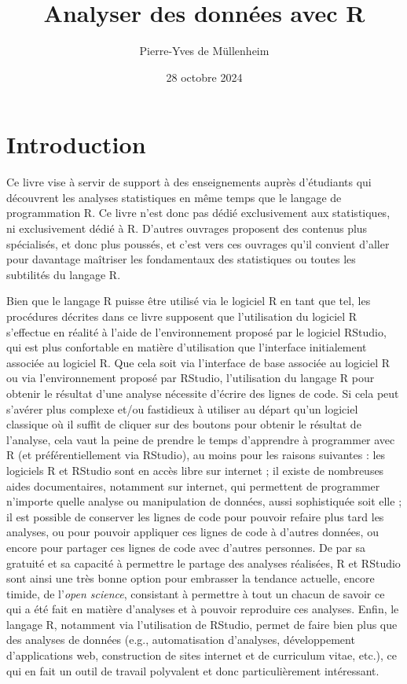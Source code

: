 \documentclass[
  letterpaper,
]{book}
\title{Analyser des données avec R}
\author{Pierre-Yves de Müllenheim}
\date{28 octobre 2024}
\renewcommand*\contentsname{Table des matières}
\newcommand\contentsname{Table des matières}
\begin{document}
\frontmatter
\maketitle

\renewcommand*\contentsname{Sommaire}
{
\setcounter{tocdepth}{2}
\tableofcontents
}

\mainmatter
{}

\chapter*{Introduction}\label{introduction}


Ce livre vise à servir de support à des enseignements auprès d'étudiants
qui découvrent les analyses statistiques en même temps que le langage de
programmation R. Ce livre n'est donc pas dédié exclusivement aux
statistiques, ni exclusivement dédié à R. D'autres ouvrages proposent
des contenus plus spécialisés, et donc plus poussés, et c'est vers ces
ouvrages qu'il convient d'aller pour davantage maîtriser les
fondamentaux des statistiques ou toutes les subtilités du langage R.

Bien que le langage R puisse être utilisé via le logiciel R en tant que
tel, les procédures décrites dans ce livre supposent que l'utilisation
du logiciel R s'effectue en réalité à l'aide de l'environnement proposé
par le logiciel RStudio, qui est plus confortable en matière
d'utilisation que l'interface initialement associée au logiciel R. Que
cela soit via l'interface de base associée au logiciel R ou via
l'environnement proposé par RStudio, l'utilisation du langage R pour
obtenir le résultat d'une analyse nécessite d'écrire des lignes de code.
Si cela peut s'avérer plus complexe et/ou fastidieux à utiliser au
départ qu'un logiciel classique où il suffit de cliquer sur des boutons
pour obtenir le résultat de l'analyse, cela vaut la peine de prendre le
temps d'apprendre à programmer avec R (et préférentiellement via
RStudio), au moins pour les raisons suivantes : les logiciels R et
RStudio sont en accès libre sur internet ; il existe de nombreuses aides
documentaires, notamment sur internet, qui permettent de programmer
n'importe quelle analyse ou manipulation de données, aussi sophistiquée
soit elle ; il est possible de conserver les lignes de code pour pouvoir
refaire plus tard les analyses, ou pour pouvoir appliquer ces lignes de
code à d'autres données, ou encore pour partager ces lignes de code avec
d'autres personnes. De par sa gratuité et sa capacité à permettre le
partage des analyses réalisées, R et RStudio sont ainsi une très bonne
option pour embrasser la tendance actuelle, encore timide, de
l'\emph{open science}, consistant à permettre à tout un chacun de savoir
ce qui a été fait en matière d'analyses et à pouvoir reproduire ces
analyses. Enfin, le langage R, notamment via l'utilisation de RStudio,
permet de faire bien plus que des analyses de données (e.g.,
automatisation d'analyses, développement d'applications web,
construction de sites internet et de curriculum vitae, etc.), ce qui en
fait un outil de travail polyvalent et donc particulièrement
intéressant.
\end{document}
